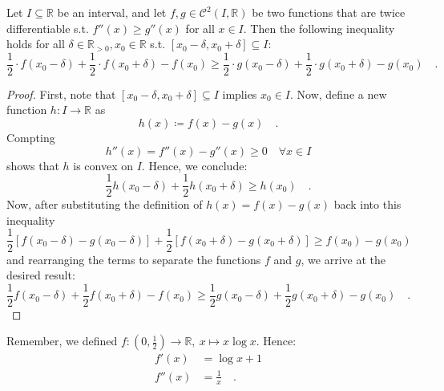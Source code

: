 \documentclass[../../main.tex]{subfiles}
\begin{document}
\begin{lemma}
    \label{lemma:convex_function_bound}
    Let $I \subseteq \mathbb{R}$ be an interval, and let $f, g \in \mathcal{C}^2(I, \mathbb{R})$ be two functions that are twice differentiable s.t. $f''(x) \geq g''(x)$ for all $x \in I$. Then the following inequality holds for all $\delta \in \mathbb{R}_{>0}, x_0 \in \mathbb{R}$ s.t. $[x_0 - \delta, x_0 + \delta] \subseteq I$:
    \[
        \frac{1}{2} \cdot f(x_0 - \delta) + \frac{1}{2} \cdot f(x_0 + \delta) - f(x_0) \geq \frac{1}{2} \cdot g(x_0 - \delta) + \frac{1}{2} \cdot g(x_0 + \delta) - g(x_0) \quad .
    \]
\end{lemma}
\begin{proof}
    First, note that $[x_0 - \delta, x_0 + \delta] \subseteq I$ implies $x_0 \in I$. Now, define a new function $h: I \to \mathbb{R}$ as
    \[
        h(x) \coloneqq f(x) - g(x) \quad .
    \]
    Compting
    \[
        h''(x) = f''(x) - g''(x) \geq 0 \quad \forall x \in I
    \]
    shows that $h$ is convex on $I$. Hence, we conclude:
    \[
        \frac{1}{2} h(x_0 - \delta) + \frac{1}{2} h(x_0 + \delta) \geq h(x_0) \quad .
    \]
    Now, after substituting the definition of $h(x) = f(x) - g(x)$ back into this inequality
    \[
        \frac{1}{2} [f(x_0 - \delta) - g(x_0 - \delta)] + \frac{1}{2} [f(x_0 + \delta) - g(x_0 + \delta)] \geq f(x_0) - g(x_0)
    \]
    and rearranging the terms to separate the functions $f$ and $g$, we arrive at the desired result:
    \[
        \frac{1}{2} f(x_0 - \delta) + \frac{1}{2} f(x_0 + \delta) - f(x_0) \geq \frac{1}{2} g(x_0 - \delta) + \frac{1}{2} g(x_0 + \delta) - g(x_0) \quad .
    \]
\end{proof}

Remember, we defined $f: (0, \frac{1}{2}) \to \mathbb{R}, \ x \mapsto x \log x$. Hence:
\begin{align*}
    f'(x) &= \log x + 1 \\
    f''(x) &= \frac{1}{x} \quad .
\end{align*}
\end{document}
